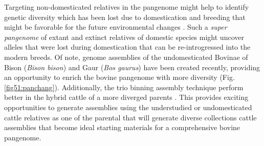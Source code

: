 \documentclass[../main.tex]{subfiles}
\begin{document}
Targeting non-domesticated relatives in the pangenome might help to identify genetic diversity which has been lost due to domestication and breeding that might be favorable for the future environmental changes \citep{khan2020super}. Such a \emph{super pangenome} of extant and extinct relatives of domestic species might uncover alleles that were lost during domestication that can be re-introgressed into the modern breeds. Of note, genome assemblies of the undomesticated Bovinae of Bison (\emph{Bison bison}) \citep{oppenheimer2021reference} and Gaur (\emph{Bos gaurus}) have been created recently, providing an opportunity to enrich the bovine pangenome with more diversity (Fig. \ref{fig51:panchang}). Additionally, the trio binning assembly technique perform better in the hybrid cattle of a more diverged parents \citep{rice2020continuous,heaton2021reference}. This provides exciting opportunities to generate assemblies using the understudied or undomesticated cattle relatives as one of the parental that will generate diverse collections cattle assemblies that become ideal starting materials for a comprehensive bovine pangenome.

\singlespacing
\footnotesize






\ifdefined\BuildingFromMainFile
\else
   
\end{document}
